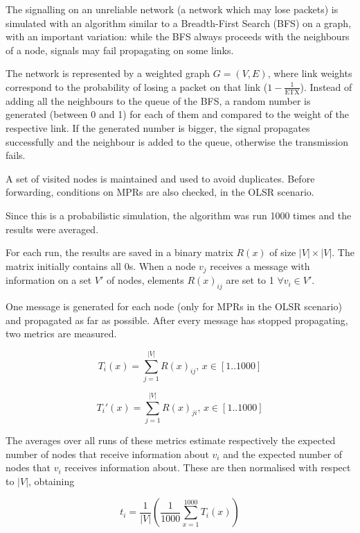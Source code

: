 \documentclass[a4paper,11pt,twoside,openleft]{memoir}
\newcommand{\etx}{\mathrm{ETX}}
\begin{document}
The signalling on an unreliable network (a network which may lose
packets) is simulated with an algorithm similar to a Breadth-First
Search (BFS) on a graph, with an important variation: while the BFS
always proceeds with the neighbours of a node, signals may fail
propagating on some links.

The network is represented by a weighted graph $G=(V, E)$, where link
weights correspond to the probability of losing a packet on that link
($1 - \frac{1}{\etx}$). Instead of adding all the neighbours to the
queue of the BFS, a random number is generated (between 0 and 1) for
each of them and compared to the weight of the respective link. If the
generated number is bigger, the signal propagates successfully and the
neighbour is added to the queue, otherwise the transmission fails.

A set of visited nodes is maintained and used to avoid duplicates.
Before forwarding, conditions on MPRs are also checked, in the OLSR
scenario.

Since this is a probabilistic simulation, the algorithm was run 1000
times and the results were averaged.

For each run, the results are saved in a binary matrix $R(x)$ of size
$|V| \times |V|$. The matrix initially contains all 0s. When a node
$v_j$ receives a message with information on a set $V'$ of nodes,
elements $R(x)_{ij}$ are set to 1 $\forall v_i \in V'$.

One message is generated for each node (only for MPRs in the OLSR
scenario) and propagated as far as possible. After every message has
stopped propagating, two metrics are measured.

\begin{equation}
T_i(x) = \sum_{j=1}^{|V|} R(x)_{ij},\, x \in [1..1000]
\end{equation}

\begin{equation}
T_i'(x) = \sum_{j=1}^{|V|} R(x)_{ji},\, x \in [1..1000]
\end{equation}

The averages over all runs of these metrics estimate respectively the
expected number of nodes that receive information about $v_i$ and the
expected number of nodes that $v_i$ receives information about. These
are then normalised with respect to $|V|$, obtaining

\begin{equation}
t_i = \frac{1}{|V|}
      \left( \frac{1}{1000} \sum_{x=1}^{1000} T_i(x) \right)
\end{equation}
\end{document}
